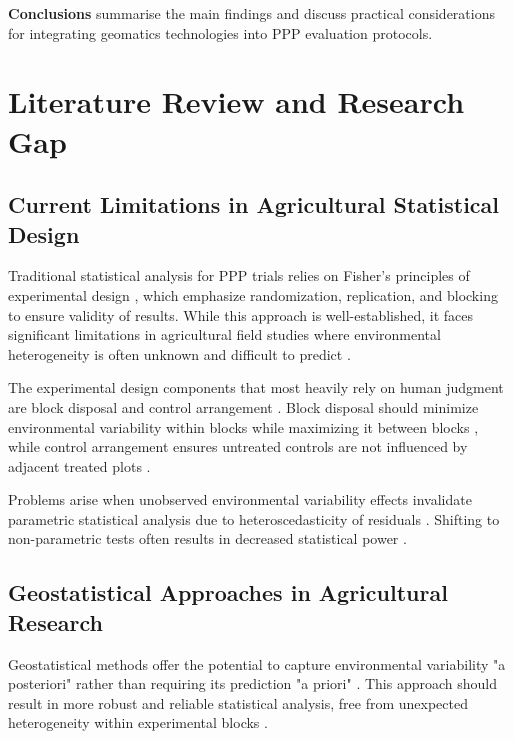\documentclass[12pt,a4paper,oneside]{report}
\begin{document}
\textbf{Conclusions} summarise the main findings and discuss practical 
considerations for integrating geomatics technologies into PPP evaluation 
protocols.

\section{Literature Review and Research Gap}

\subsection{Current Limitations in Agricultural Statistical Design}

Traditional statistical analysis for PPP trials relies on Fisher's principles of experimental design \cite{fisherStatisticalMethodsResearch1992,meadStatisticalPrinciplesDesign2012,caslerFundamentalsExperimentalDesign2015}, which emphasize randomization, replication, and blocking to ensure validity of results. While this approach is well-established, it faces significant limitations in agricultural field studies where environmental heterogeneity is often unknown and difficult to predict \cite{paroliniPursuitScienceAgriculture2015,berryResistedRiseRandomisation2015}.

The experimental design components that most heavily rely on human judgment are block disposal and control arrangement \cite{tocherDesignAnalysisBlock1952,williamsOptimalityContrastsBlock2015}. Block disposal should minimize environmental variability within blocks while maximizing it between blocks \cite{vanesSpatialNatureRandomization1993,brienMultiphaseExperimentsLeast2011}, while control arrangement ensures untreated controls are not influenced by adjacent treated plots \cite{piephoWhyRandomizeAgricultural2013}.

Problems arise when unobserved environmental variability effects invalidate parametric statistical analysis due to heteroscedasticity of residuals \cite{schabenbergerStatisticalMethodsSpatial2004,onofriNewMethodAnalysis2010}. Shifting to non-parametric tests often results in decreased statistical power \cite{stroupRethinkingAnalysisNonNormal2015,agrestiIntroductionCategoricalData2018}.

\subsection{Geostatistical Approaches in Agricultural Research}

Geostatistical methods offer the potential to capture environmental variability "a posteriori" rather than requiring its prediction "a priori" \cite{oliverGeostatisticalApplicationsPrecision2010,websterGeostatisticsEnvironmentalScientists2007}. This approach should result in more robust and reliable statistical analysis, free from unexpected heterogeneity within experimental blocks \cite{richterGeostatisticalModelsAgricultural2012,lopezEfficiencyIncompleteBlock1995}.
\end{document}
